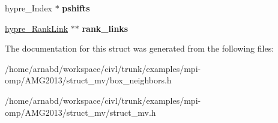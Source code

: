 \begin{DoxyCompactItemize}
\item 
\hypertarget{structhypre__BoxNeighbors__struct_ac8f0c5773b92cd12ba3823360b77448c}{}hypre\+\_\+\+Index $\ast$ {\bfseries pshifts}\label{structhypre__BoxNeighbors__struct_ac8f0c5773b92cd12ba3823360b77448c}

\item 
\hypertarget{structhypre__BoxNeighbors__struct_a9d159d2d9b70dd9a714583d67365a9f8}{}\hyperlink{structhypre__RankLink__struct}{hypre\+\_\+\+Rank\+Link} $\ast$$\ast$ {\bfseries rank\+\_\+links}\label{structhypre__BoxNeighbors__struct_a9d159d2d9b70dd9a714583d67365a9f8}

\end{DoxyCompactItemize}


The documentation for this struct was generated from the following files\+:\begin{DoxyCompactItemize}
\item 
/home/arnabd/workspace/civl/trunk/examples/mpi-\/omp/\+A\+M\+G2013/struct\+\_\+mv/box\+\_\+neighbors.\+h\item 
/home/arnabd/workspace/civl/trunk/examples/mpi-\/omp/\+A\+M\+G2013/struct\+\_\+mv/struct\+\_\+mv.\+h\end{DoxyCompactItemize}
